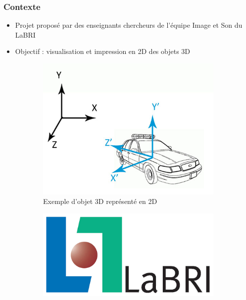 \documentclass{beamer}
\begin{document}
\begin{frame}
\frametitle{Contexte}

\begin{itemize}[label=$\bullet$]
\item Projet proposé par des enseignants chercheurs de l'équipe Image et Son du LaBRI
\item Objectif : visualisation et impression en 2D des objets 3D
\end{itemize}

\begin{figure}
\centering
\begin{subfigure}{.4\textwidth}
  \centering
  \includegraphics[scale=0.3]{scene.jpg}
  \caption{Exemple d'objet 3D représenté en 2D \footnotemark}
\end{subfigure}
\hspace*{1cm}
\begin{subfigure}{.4\textwidth}
  \centering
  \includegraphics[scale=0.3]{logolabri.jpg}
\end{subfigure}
\end{figure}

\end{frame}
\end{document}
